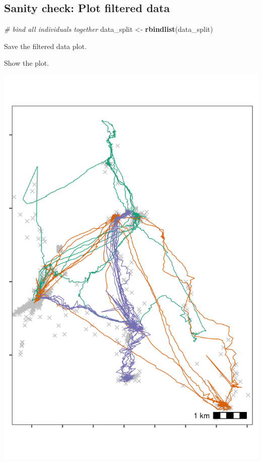 \documentclass[
]{scrreprt}
\newenvironment{Shaded}{}{}
\newcommand{\CommentTok}[1]{\textcolor[rgb]{0.38,0.63,0.69}{\textit{#1}}}
\newcommand{\KeywordTok}[1]{\textcolor[rgb]{0.00,0.44,0.13}{\textbf{#1}}}
\newcommand{\NormalTok}[1]{#1}
\newcommand{\StringTok}[1]{\textcolor[rgb]{0.25,0.44,0.63}{#1}}
\begin{document}
\hypertarget{sanity-check-plot-filtered-data}{%
\subsection{Sanity check: Plot filtered data}\label{sanity-check-plot-filtered-data}}

\begin{Shaded}
\begin{Highlighting}[]
\CommentTok{\# bind all individuals together}
\NormalTok{data\_split <{-}}\StringTok{ }\KeywordTok{rbindlist}\NormalTok{(data\_split)}
\end{Highlighting}
\end{Shaded}

Save the filtered data plot.

Show the plot.

\includegraphics{figures/fig_bat_filter_cov.png}
\end{document}
